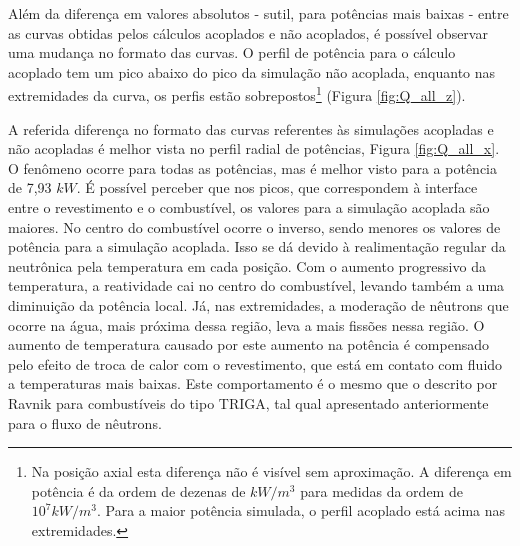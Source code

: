 Além da diferença em valores absolutos - sutil, para potências mais baixas - entre as curvas obtidas pelos
cálculos acoplados e não acoplados, é possível observar uma mudança no formato das curvas. O perfil de
potência para o cálculo acoplado tem um pico abaixo do pico da simulação
não acoplada, enquanto nas extremidades da curva, os perfis estão sobrepostos\footnote{Na posição
  axial esta diferença não é visível sem aproximação. A diferença em potência é da ordem de dezenas de $kW/m^3$ para medidas da
  ordem de $10^7 kW/m^3$. Para a maior potência simulada, o perfil acoplado está acima nas extremidades.} (Figura \ref{fig:Q_all_z}).

A referida diferença no formato das curvas referentes às simulações acopladas e não acopladas é melhor vista no
perfil radial de potências, Figura \ref{fig:Q_all_x}. O fenômeno ocorre para todas as potências, mas é melhor
visto para a potência de 7,93 $kW$. É possível perceber que nos picos, que correspondem à interface entre o
revestimento e o combustível, os valores para a simulação acoplada são maiores. No centro do combustível
ocorre o inverso, sendo menores os valores de potência para a simulação acoplada. Isso se dá devido à realimentação
regular da neutrônica pela temperatura em cada posição. Com o aumento progressivo da temperatura, a reatividade
cai no centro do combustível, levando também a uma diminuição da potência local. Já, nas extremidades, a moderação
de nêutrons que ocorre na água, mais próxima dessa região, leva a mais fissões nessa região. O aumento de temperatura
causado por este aumento na potência é compensado pelo efeito de troca de calor com o revestimento, que está em contato com fluido
a temperaturas mais baixas. Este comportamento é o mesmo que o descrito por Ravnik \cite{Ravnik1990}
para combustíveis do tipo TRIGA, tal qual apresentado anteriormente para o fluxo de nêutrons.


